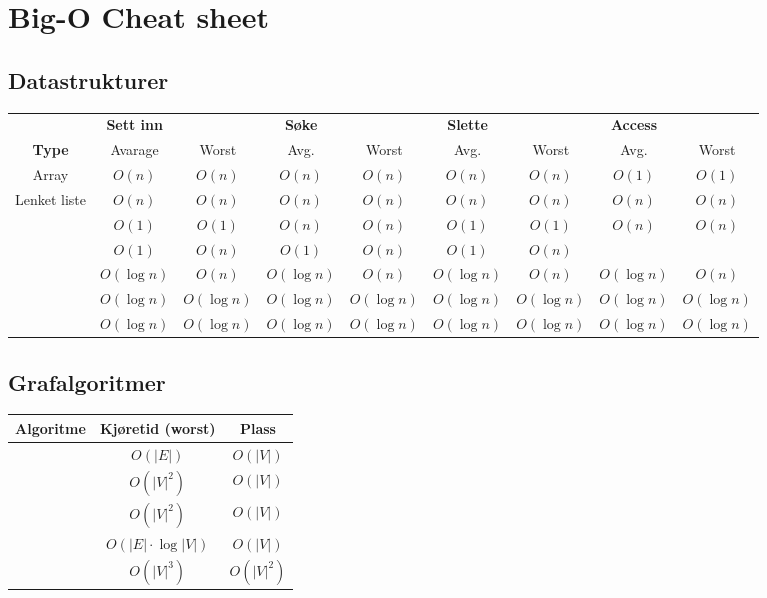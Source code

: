 \chapter{Big-O Cheat sheet}
\vspace{-20pt}
\section*{Datastrukturer}

\begin{table}[h!]
\scriptsize
\centering
\begin{tabular}{c || c  c | c c | c c | c c} 
	                   & \textbf{Sett inn} &               & \textbf{Søke} & & \textbf{Slette} & & \textbf{Access} & \\
	 \textbf{Type}     & {Avarage}         & {Worst}       &Avg.&Worst&Avg.&Worst&Avg.&Worst\\ \hline
	 Array & $ O(n) $ & $ O(n) $ & $ O(n) $ & $ O(n) $ & $ O(n) $ & $ O(n) $ & $ O(1) $ & $ O(1) $ \\
	 Lenket liste & $ O(n) $ & $ O(n) $ & $ O(n) $ & $ O(n) $ & $ O(n) $ & $ O(n) $ & $ O(n) $ & $ O(n) $ \\
	 \nameref{ko_stack} & $ O(1) $ & $ O(1) $ & $ O(n) $ & $ O(n) $ & $ O(1) $ & $ O(1) $ & $ O(n) $ & $ O(n) $ \\
	 \nameref{hashmap} & $ O(1) $ & $ O(n) $ & $ O(1) $ & $ O(n) $ & $ O(1) $ & $ O(n) $ & & \\
	\nameref{bintraer} & $ O(\log n) $     & $ O(n) $   & $ O(\log n) $     & $ O(n) $  & $ O(\log n) $     & $ O(n) $  & $ O(\log n) $     & $ O(n) $ \\
	 \nameref{rb_tre}  & $ O(\log n) $     & $ O(\log n) $ & $ O(\log n) $     & $ O(\log n) $& $ O(\log n) $     & $ O(\log n) $& $ O(\log n) $     & $ O(\log n) $\\
	 \nameref{b-tre}   & $ O(\log n) $     & $ O(\log n) $ & $ O(\log n) $     & $ O(\log n) $& $ O(\log n) $     & $ O(\log n) $& $ O(\log n) $     & $ O(\log n) $
\end{tabular}
\end{table}

\vspace{-20pt}
\section*{Grafalgoritmer}
\begin{center}
\begin{tabular}{c || c | c}
	\textbf{Algoritme} & \textbf{Kjøretid (worst)}   & \textbf{Plass} \\ \hline
	  \nameref{dfs}    & $ O(|E|) $                  & $ O(|V|) $     \\
	\nameref{dijkstra} & $ O(|V|^2) $                & $ O(|V|) $     \\
	  \nameref{prim}   & $ O(|V|^2) $                & $ O(|V|) $     \\
	\nameref{kruskal}  & $ O(|E| \cdot \log |V|) $ & $ O(|V|) $     \\
	 \nameref{floyd}   & $ O(|V|^3) $                & $ O(|V|^2) $
\end{tabular}
\end{center}

